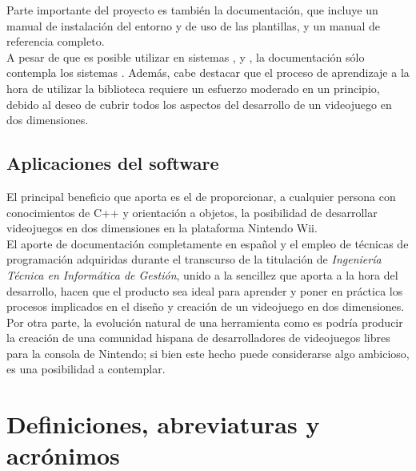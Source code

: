 Parte importante del proyecto es también la documentación, que incluye un manual de instalación del entorno y de uso de las plantillas, y un manual de referencia completo.\\

A pesar de que es posible utilizar  en sistemas ,  y , la documentación sólo contempla los sistemas . Además, cabe destacar que el proceso de aprendizaje a la hora de utilizar la biblioteca requiere un esfuerzo moderado en un principio, debido al deseo de cubrir todos los aspectos del desarrollo de un videojuego en dos dimensiones.

\subsection{Aplicaciones del software}

El principal beneficio que aporta  es el de proporcionar, a cualquier persona con conocimientos de C++ y orientación a objetos, la posibilidad de desarrollar videojuegos en dos dimensiones en la plataforma Nintendo Wii.\\

El aporte de documentación completamente en español y el empleo de técnicas de programación adquiridas durante el transcurso de la titulación de \emph{Ingeniería Técnica en Informática de Gestión}, unido a la sencillez que aporta a la hora del desarrollo, hacen que el producto sea ideal para aprender y poner en práctica los procesos implicados en el diseño y creación de un videojuego en dos dimensiones.\\

Por otra parte, la evolución natural de una herramienta como es  podría producir la creación de una comunidad hispana de desarrolladores de videojuegos libres para la consola de Nintendo; si bien este hecho puede considerarse algo ambicioso, es una posibilidad a contemplar.

\section{Definiciones, abreviaturas y acrónimos}

